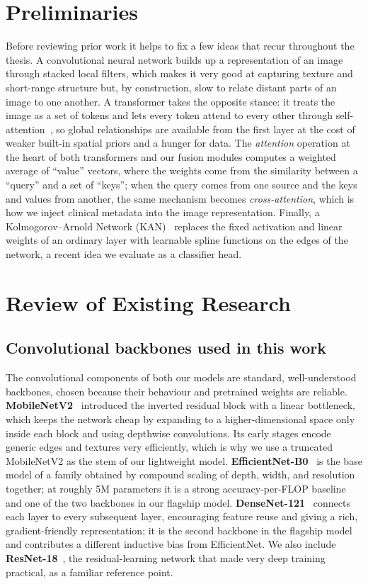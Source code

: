 \section{Preliminaries}

Before reviewing prior work it helps to fix a few ideas that recur throughout
the thesis. A convolutional neural network builds up a representation of an image
through stacked local filters, which makes it very good at capturing texture and
short-range structure but, by construction, slow to relate distant parts of an
image to one another. A transformer takes the opposite stance: it treats the
image as a set of tokens and lets every token attend to every other through
self-attention~\cite{vaswani2017attention,dosovitskiy2021vit}, so global
relationships are available from the first layer at the cost of weaker built-in
spatial priors and a hunger for data. The \emph{attention} operation at the
heart of both transformers and our fusion modules computes a weighted average of
``value'' vectors, where the weights come from the similarity between a
``query'' and a set of ``keys''; when the query comes from one source and the
keys and values from another, the same mechanism becomes \emph{cross-attention},
which is how we inject clinical metadata into the image representation. Finally,
a Kolmogorov--Arnold Network (KAN)~\cite{liu2024kan} replaces the fixed
activation and linear weights of an ordinary layer with learnable spline
functions on the edges of the network, a recent idea we evaluate as a classifier
head.

\section{Review of Existing Research}

\subsection{Convolutional backbones used in this work}

The convolutional components of both our models are standard, well-understood
backbones, chosen because their behaviour and pretrained weights are reliable.
\textbf{MobileNetV2}~\cite{sandler2018mobilenetv2} introduced the inverted
residual block with a linear bottleneck, which keeps the network cheap by
expanding to a higher-dimensional space only inside each block and using
depthwise convolutions. Its early stages encode generic edges and textures very
efficiently, which is why we use a truncated MobileNetV2 as the stem of our
lightweight model. \textbf{EfficientNet-B0}~\cite{tan2019efficientnet} is the
base model of a family obtained by compound scaling of depth, width, and
resolution together; at roughly 5M parameters it is a strong accuracy-per-FLOP
baseline and one of the two backbones in our flagship model.
\textbf{DenseNet-121}~\cite{huang2017densenet} connects each layer to every
subsequent layer, encouraging feature reuse and giving a rich, gradient-friendly
representation; it is the second backbone in the flagship model and contributes a
different inductive bias from EfficientNet. We also include
\textbf{ResNet-18}~\cite{he2016resnet}, the residual-learning network that made
very deep training practical, as a familiar reference point.

